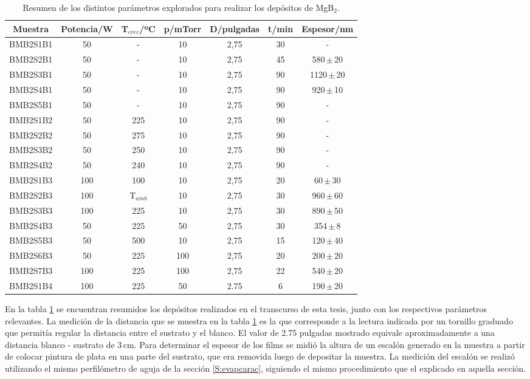 \begin{table}[h!]
\centering
\begin{tabular}{|c||c|c|c|c|c|c|} \hline
Muestra	& Potencia/W & T$_{crec}$/ºC & p/mTorr & D/pulgadas & t/min & Espesor/nm \\ \hline \hline
BMB2S1B1 & 50 &	-	& 10 & 2,75	&  30 &	- \\
BMB2S2B1 & 50 &	-	& 10 & 2,75	&  45 &	580\,$\pm$\,20 \\
BMB2S3B1 & 50 & - & 10 & 2,75 &  90 & 1120\,$\pm$\,20 \\
BMB2S4B1 & 50 & - & 10 & 2,75 &  90 & 920\,$\pm$\,10 \\
BMB2S5B1 & 50 & - & 10 & 2,75 &  90 & - \\ \hline
BMB2S1B2 & 50 & 225 & 10 & 2,75 &  90 & - \\
BMB2S2B2 & 50 & 275 & 10 & 2,75 &  90 & - \\
BMB2S3B2 & 50 & 250 & 10 & 2,75 &  90 & - \\
BMB2S4B2 & 50 & 240 & 10 & 2,75 &  90 & - \\ \hline
BMB2S1B3 & 100 & 100 & 10 & 2,75 &  20 & 60\,$\pm$\,30 \\
BMB2S2B3 & 100 & T$_{amb}$ & 10 & 2,75 &  30 & 960\,$\pm$\,60 \\
BMB2S3B3 & 100 & 225 & 10 & 2,75 &  30 & 890\,$\pm$\,50 \\
BMB2S4B3 & 50 & 225 & 50 & 2,75 &  30 & 354\,$\pm$\,8 \\ 
BMB2S5B3 & 50 & 500 & 10 & 2,75 &  15 & 120\,$\pm$\,40 \\
BMB2S6B3 & 50 & 225 & 100 & 2,75 &  20 & 200\,$\pm$\,20 \\  
BMB2S7B3 & 100 & 225 & 100 & 2,75 &  22 & 540\,$\pm$\,20 \\ \hline
BMB2S1B4 & 100 & 225 & 50 & 2.75 & 6 & 190\,$\pm$\,20 \\ \hline
\end{tabular}
\caption{Resumen de los distintos parámetros explorados para realizar los depósitos de MgB$_2$.}
\label{tab:depositos}
\end{table}

En la tabla \ref{tab:depositos} se encuentran resumidos los depósitos realizados en el transcurso de esta tesis, junto con los respectivos parámetros relevantes. La medición de la distancia que se muestra en la tabla \ref{tab:depositos} es la que corresponde a la lectura indicada por un tornillo graduado que permitía regular la distancia entre el sustrato y el blanco. El valor de 2.75 pulgadas mostrado equivale aproximadamente a una distancia blanco - sustrato de 3\,cm. Para determinar el espesor de los films se midió la altura de un escalón generado en la muestra a partir de colocar pintura de plata en una parte del sustrato, que era removida luego de depositar la muestra. La medición del escalón se realizó utilizando el mismo perfilómetro de aguja de la sección \ref{S:evapcarac}, siguiendo el mismo procedimiento que el explicado en aquella sección.

